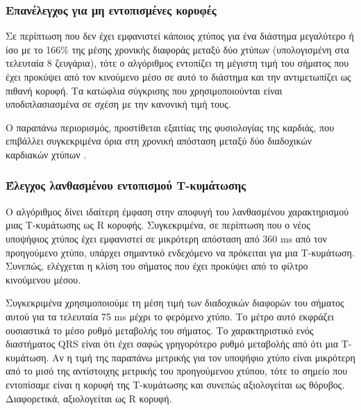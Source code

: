 \subsubsection*{Επανέλεγχος για μη εντοπισμένες κορυφές}

Σε περίπτωση που δεν έχει εμφανιστεί κάποιος χτύπος για ένα διάστημα μεγαλύτερο ή ίσο με το 166\% της μέσης χρονικής διαφοράς μεταξύ δύο χτύπων (υπολογισμένη στα τελευταία 8 ζευγάρια), τότε ο αλγόριθμος εντοπίζει τη μέγιστη τιμή του σήματος που έχει προκύψει από τον κινούμενο μέσο σε αυτό το διάστημα και την αντιμετωπίζει ως πιθανή κορυφή. Τα κατώφλια σύγκρισης που χρησιμοποιούνται είναι υποδιπλασιασμένα σε σχέση με την κανονική τιμή τους.

Ο παραπάνω περιορισμός, προστίθεται εξαιτίας της φυσιολογίας της καρδιάς, που επιβάλλει συγκεκριμένα όρια στη χρονική απόσταση μεταξύ δύο διαδοχικών καρδιακών χτύπων \cite{pan_tompkins}.

\subsubsection*{Έλεγχος λανθασμένου εντοπισμού Τ-κυμάτωσης}

Ο αλγόριθμος δίνει ιδαίτερη έμφαση στην αποφυγή του λανθασμένου χαρακτηρισμού μιας Τ-κυμάτωσης ως R κορυφής. Συγκεκριμένα, σε περίπτωση που ο νέος υποψήφιος χτύπος έχει εμφανιστεί σε μικρότερη απόσταση από 360 ms από τον προηγούμενο χτύπο, υπάρχει σημαντικό ενδεχόμενο να πρόκειται για μια Τ-κυμάτωση. Συνεπώς, ελέγχεται η κλίση του σήματος που έχει προκύψει από το φίλτρο κινούμενου μέσου. 

Συγκεκριμένα χρησιμοποιούμε τη μέση τιμή των διαδοχικών διαφορών του σήματος αυτού για τα τελευταία 75 ms μέχρι το φερόμενο χτύπο. Το μέτρο αυτό εκφράζει ουσιαστικά το μέσο ρυθμό μεταβολής του σήματος. Το χαρακτηριστικό ενός διαστήματος QRS είναι ότι έχει σαφώς γρηγορότερο ρυθμό μεταβολής από ότι μια Τ-κυμάτωση. Αν η τιμή της παραπάνω μετρικής για τον υποψήφιο χτύπο είναι μικρότερη από το μισό της αντίστοιχης μετρικής του προηγούμενου χτύπου, τότε το σημείο που εντοπίσαμε είναι η κορυφή της Τ-κυμάτωσης και συνεπώς αξιολογείται ως θόρυβος. Διαφορετικά, αξιολογείται ως R κορυφή.

